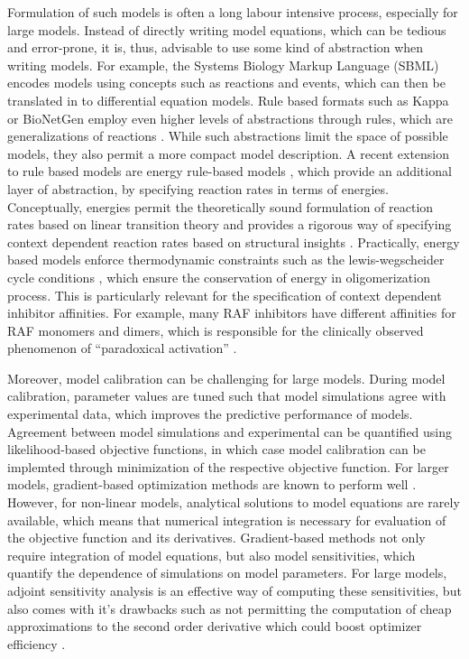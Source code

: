 \documentclass[11pt]{article}
\begin{document}
    Formulation of such models is often a long labour intensive process,
especially for large models. Instead of directly writing model
equations, which can be tedious and error-prone, it is, thus, advisable
to use some kind of abstraction when writing models. For example, the
Systems Biology Markup Language (SBML) \cite{2754712/NF7FZULE} encodes
models using concepts such as reactions and events, which can then be
translated in to differential equation models. Rule based formats such
as Kappa \cite{2754712/NAKF6985} or BioNetGen \cite{2754712/M82A4YPP}
employ even higher levels of abstractions through rules, which are
generalizations of reactions \cite{2754712/MIF24GAE}. While such
abstractions limit the space of possible models, they also permit a more
compact model description. A recent extension to rule based models are
energy rule-based models \cite{2754712/6CAKFQQP}
\cite{2754712/QTNJGKHE}, which provide an additional layer of
abstraction, by specifying reaction rates in terms of energies.
Conceptually, energies permit the theoretically sound formulation of
reaction rates based on linear transition theory and provides a rigorous
way of specifying context dependent reaction rates based on structural
insights \cite{2754712/7TJH2IAK} \cite{2754712/DI7IDWLV}. Practically,
energy based models enforce thermodynamic constraints such as the
lewis-wegscheider cycle conditions \cite{2754712/VAJ8A9TA}, which ensure
the conservation of energy in oligomerization process. This is
particularly relevant for the specification of context dependent
inhibitor affinities. For example, many RAF inhibitors have different
affinities for RAF monomers and dimers, which is responsible for the
clinically observed phenomenon of ``paradoxical activation''
\cite{2754712/68C3KR4X} \cite{2754712/GPZDY42G} \cite{2754712/46UNKAAD}.

    Moreover, model calibration can be challenging for large models. During
model calibration, parameter values are tuned such that model
simulations agree with experimental data, which improves the predictive
performance of models. Agreement between model simulations and
experimental can be quantified using likelihood-based objective
functions, in which case model calibration can be implemted through
minimization of the respective objective function. For larger models,
gradient-based optimization methods are known to perform well
\cite{2754712/INKV577L}. However, for non-linear models, analytical
solutions to model equations are rarely available, which means that
numerical integration is necessary for evaluation of the objective
function and its derivatives. Gradient-based methods not only require
integration of model equations, but also model sensitivities, which
quantify the dependence of simulations on model parameters. For large
models, adjoint sensitivity analysis is an effective way of computing
these sensitivities, but also comes with it's drawbacks such as not
permitting the computation of cheap approximations to the second order
derivative which could boost optimizer efficiency
\cite{2754712/MKPQ9727}.
\end{document}
